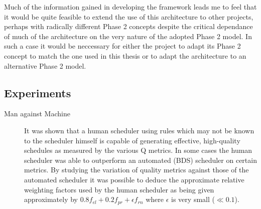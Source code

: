 Much of the information gained in developing the framework leads me to feel that it would be quite feasible to extend the use of this architecture to other projects, perhaps with radically different Phase 2 concepts despite the critical dependance of much of the architecture on the very nature of the adopted Phase 2 model. In such a case it would be neccessary for either the project to adapt its Phase 2 concept to match the one used in this thesis or to adapt the architecture to an alternative Phase 2 model. 

\subsection{Experiments}

\begin{description}
\item[Man against Machine]
It was shown that a human scheduler using rules which may not be known to the scheduler himself is capable of generating effective, high-quality schedules as measured by the various Q metrics. In some cases the human scheduler was able to outperform an automated (BDS) scheduler on certain metrics. By studying the variation of quality metrics against those of the automated scheduler it was possible to deduce the approximate relative weighting factors used by the human scheduler as being given approximately by $0.8 f_{el} + 0.2 f_{pr}+ \epsilon f_{rn}$ where $\epsilon$ is very small ($\ll 0.1$).


\end{description}
